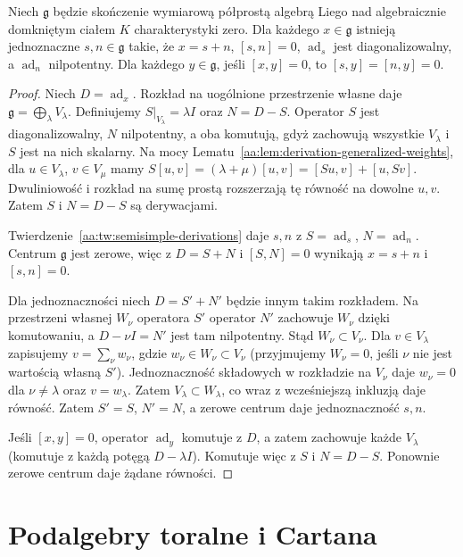 \begin{twierdzenie}
\label{aa:tw:inner-jordan}
Niech $\mathfrak g$ będzie skończenie wymiarową półprostą algebrą Liego nad algebraicznie domkniętym ciałem $K$ charakterystyki zero. Dla każdego $x\in\mathfrak g$ istnieją jednoznaczne $s,n\in\mathfrak g$ takie, że $x=s+n$, $[s,n]=0$, $\operatorname{ad}_s$ jest diagonalizowalny, a $\operatorname{ad}_n$ nilpotentny. Dla każdego $y\in\mathfrak g$, jeśli $[x,y]=0$, to $[s,y]=[n,y]=0$.
\end{twierdzenie}
\begin{proof}
Niech $D=\operatorname{ad}_x$. Rozkład na uogólnione przestrzenie własne daje $\mathfrak g=\bigoplus_\lambda V_\lambda$. Definiujemy $S|_{V_\lambda}=\lambda I$ oraz $N=D-S$. Operator $S$ jest diagonalizowalny, $N$ nilpotentny, a oba komutują, gdyż zachowują wszystkie $V_\lambda$ i $S$ jest na nich skalarny. Na mocy Lematu~\ref{aa:lem:derivation-generalized-weights}, dla $u\in V_\lambda$, $v\in V_\mu$ mamy
$S[u,v]=(\lambda+\mu)[u,v]=[Su,v]+[u,Sv]$.
Dwuliniowość i rozkład na sumę prostą rozszerzają tę równość na dowolne $u,v$. Zatem $S$ i $N=D-S$ są derywacjami.

Twierdzenie~\ref{aa:tw:semisimple-derivations} daje $s,n$ z $S=\operatorname{ad}_s$, $N=\operatorname{ad}_n$. Centrum $\mathfrak g$ jest zerowe, więc z $D=S+N$ i $[S,N]=0$ wynikają $x=s+n$ i $[s,n]=0$.

Dla jednoznaczności niech $D=S'+N'$ będzie innym takim rozkładem. Na przestrzeni własnej $W_\nu$ operatora $S'$ operator $N'$ zachowuje $W_\nu$ dzięki komutowaniu, a $D-\nu I=N'$ jest tam nilpotentny. Stąd $W_\nu\subset V_\nu$. Dla $v\in V_\lambda$ zapisujemy $v=\sum_\nu w_\nu$, gdzie $w_\nu\in W_\nu\subset V_\nu$ (przyjmujemy $W_\nu=0$, jeśli $\nu$ nie jest wartością własną $S'$). Jednoznaczność składowych w rozkładzie na $V_\nu$ daje $w_\nu=0$ dla $\nu\ne\lambda$ oraz $v=w_\lambda$. Zatem $V_\lambda\subset W_\lambda$, co wraz z wcześniejszą inkluzją daje równość. Zatem $S'=S$, $N'=N$, a zerowe centrum daje jednoznaczność $s,n$.

Jeśli $[x,y]=0$, operator $\operatorname{ad}_y$ komutuje z $D$, a zatem zachowuje każde $V_\lambda$ (komutuje z każdą potęgą $D-\lambda I$). Komutuje więc z $S$ i $N=D-S$. Ponownie zerowe centrum daje żądane równości.
\end{proof}

\section{Podalgebry toralne i Cartana}

